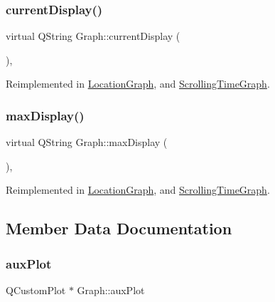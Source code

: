 \subsubsection{\texorpdfstring{current\+Display()}{currentDisplay()}}
{\footnotesize\ttfamily virtual Q\+String Graph\+::current\+Display (\begin{DoxyParamCaption}{ }\end{DoxyParamCaption})\hspace{0.3cm}{\ttfamily [inline]}, {\ttfamily [virtual]}}



Reimplemented in \hyperlink{class_location_graph_ab0f46de5c3a6b72556762bbf02d6a4b3}{Location\+Graph}, and \hyperlink{class_scrolling_time_graph_ae27ff79b4314b792ecdd27fc6115e0bf}{Scrolling\+Time\+Graph}.

\hypertarget{class_graph_a5102e5e984c2ddebb79b9771b9d37f9f}{}\label{class_graph_a5102e5e984c2ddebb79b9771b9d37f9f} 
\subsubsection{\texorpdfstring{max\+Display()}{maxDisplay()}}
{\footnotesize\ttfamily virtual Q\+String Graph\+::max\+Display (\begin{DoxyParamCaption}{ }\end{DoxyParamCaption})\hspace{0.3cm}{\ttfamily [inline]}, {\ttfamily [virtual]}}



Reimplemented in \hyperlink{class_location_graph_a8ac355338680e55af26cb3e74b76d278}{Location\+Graph}, and \hyperlink{class_scrolling_time_graph_a3d0314f268e3eeb7396733147f710ef0}{Scrolling\+Time\+Graph}.



\subsection{Member Data Documentation}
\hypertarget{class_graph_ac7d10642e5439fd87d7d4bc5a33e643d}{}\label{class_graph_ac7d10642e5439fd87d7d4bc5a33e643d} 
\subsubsection{\texorpdfstring{aux\+Plot}{auxPlot}}
{\footnotesize\ttfamily Q\+Custom\+Plot $\ast$ Graph\+::aux\+Plot\hspace{0.3cm}{\ttfamily [protected]}}

